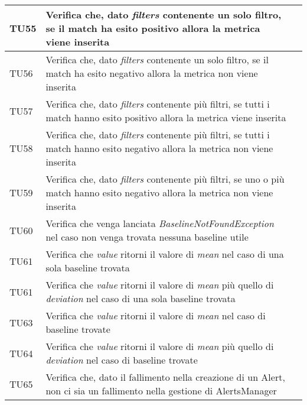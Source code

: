 \begin{longtable}{  | >{\centering\arraybackslash}m{2.5cm} 
						| >{\raggedright\arraybackslash}m{9cm} 
						| >{\centering\arraybackslash}m{3.5cm} | }
				TU55 & Verifica che, dato \textit{filters} contenente un solo filtro, se il match ha esito positivo allora la metrica viene inserita					& \donetext{} \\ \hline
				TU56 & Verifica che, dato \textit{filters} contenente un solo filtro, se il match ha esito negativo allora la metrica non viene inserita					& \donetext{} \\ \hline
				TU57 & Verifica che, dato \textit{filters} contenente più filtri, se tutti i match hanno esito positivo allora la metrica viene inserita					& \donetext{} \\ \hline
				TU58 & Verifica che, dato \textit{filters} contenente più filtri, se tutti i match hanno esito negativo allora la metrica non viene inserita					& \donetext{} \\ \hline
				TU59 & Verifica che, dato \textit{filters} contenente più filtri, se uno o più match hanno esito negativo allora la metrica non viene inserita					& \donetext{} \\ \hline


				TU60 & Verifica che venga lanciata \textit{BaselineNotFoundException} nel caso non venga trovata nessuna baseline utile
						& \donetext{} \\ \hline
				TU61 & Verifica che \textit{value} ritorni il valore di \textit{mean} nel caso di una sola baseline trovata
						& \donetext{} \\ \hline
				TU61 & Verifica che \textit{value} ritorni il valore di \textit{mean} più quello di \textit{deviation} nel caso di una sola baseline trovata				& \donetext{} \\ \hline
				TU63 & Verifica che \textit{value} ritorni il valore di \textit{mean} nel caso di baseline trovate
						& \donetext{} \\ \hline
				TU64 & Verifica che \textit{value} ritorni il valore di \textit{mean} più quello di \textit{deviation} nel caso di baseline trovate						& \donetext{} \\ \hline


				TU65 & Verifica che, dato il fallimento nella creazione di un Alert, non ci sia un fallimento nella gestione di AlertsManager
						& \donetext{} \\ \hline


\end{longtable}
